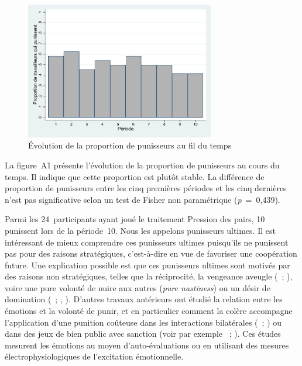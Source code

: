 \begin{Article}
\begin{refsection}[Lebourges]
\begin{appendices}
\begin{figure}[h]
    \centering
    \caption{Évolution de la proportion de punisseurs au fil du temps}
    \includegraphics[height=6cm]{05_graphA1.pdf}
\end{figure}

La figure~A1 présente l'évolution de la proportion de punisseurs au
cours du temps. Il indique que cette proportion est plutôt stable. La
différence de proportion de punisseurs entre les cinq premières périodes
et les cinq dernières n'est pas significative selon un test de Fisher
non paramétrique (\emph{p}~=~0,439).

Parmi les 24~participants ayant joué le traitement Pression des pairs,
10 punissent lors de la période~10. Nous les appelons punisseurs
ultimes. Il est intéressant de mieux comprendre ces punisseurs ultimes
puisqu'ils ne punissent pas pour des raisons stratégiques, c'est-à-dire
en vue de favoriser une coopération future. Une explication possible est
que ces punisseurs ultimes sont motivés par des raisons non
stratégiques, telles que la réciprocité, la vengeance aveugle
(\textcite{Nikiforakis2004}~; \textcite{DenantBoemontMascletNoussair2007}), voire une pure volonté de nuire aux autres (\emph{pure
nastiness}) ou un désir de domination (\textcite{Zizzo2003}~; \textcite{CinyabugumaPagePutterman2004}, \textcite{CinyabugumaPagePutterman2006}). D'autres travaux antérieurs ont étudié la relation entre les émotions et la volonté de punir, et en
particulier comment la colère accompagne l'application d'une punition
coûteuse dans les interactions bilatérales (\textcite{BosmanVanWinden2002}~; \textcite{BenShakharBornsteinHopfensitzVanWinden2007}) ou dans des jeux de bien
public avec sanction (voir par exemple \textcite{JoffilyMascletNoussairVilleval2014}~; \textcite{DickinsonMasclet2015}). Ces études mesurent les
émotions au moyen d'auto-évaluations ou en utilisant des mesures
électrophysiologiques de l'excitation émotionnelle.


\end{appendices}
\end{refsection}
\end{Article}
